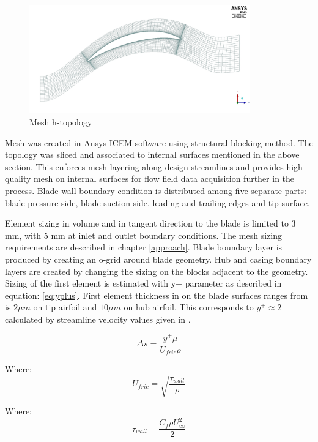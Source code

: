 \begin{figure}[h!]
\centering %
\includegraphics[width=0.85\textwidth]{Pictures/r67_htopo.jpg}
\caption{Mesh h-topology}
\label{h_topo}
\end{figure}

Mesh was created in Ansys ICEM software using structural blocking method. The topology was sliced and associated to internal surfaces mentioned in the above section. This enforces mesh layering along design streamlines and provides high quality mesh on internal surfaces for flow field data acquisition further in the process. Blade wall boundary condition is distributed among five separate parts: blade pressure side, blade suction side, leading and trailing edges and tip surface. 

Element sizing in volume and in tangent direction to the blade is limited to 3 mm, with 5 mm at inlet and outlet boundary conditions. The mesh sizing requirements are described in chapter \ref{approach}.  Blade boundary layer is produced by creating an o-grid around blade geometry. Hub and casing boundary layers are created by changing the sizing on the blocks adjacent to the geometry. Sizing of the first element is estimated with y+ parameter as described in equation: \ref{eq:yplus}. First element thickness in on the blade surfaces ranges from is $2 \mu m$ on tip airfoil and $10 \mu m$ on hub airfoil. This corresponds to $y^{+} \approx 2$ calculated by streamline velocity values given in \citep{r67laser}.

\begin{equation} \label{eq:yplus}
\Delta s = \frac{y^{+} \mu}{U_{fric} \rho}
\end{equation}

Where:
\begin{equation}
U_{fric} = \sqrt{\frac{\tau_{wall}}{\rho}}
\end{equation}

Where:
\begin{equation}
\tau_{wall} = \frac{C_f \rho U_{\infty}^{2}}{2}
\end{equation}

